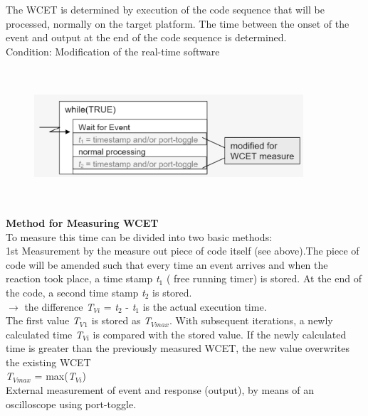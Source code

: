 The WCET is determined by execution of the code sequence that will be processed, normally on the target platform. The time between the onset of the event and output at the end of the code sequence is determined.\\
 
Condition: Modification of the real-time software

	\begin{figure}[h]
    \centering
    \includegraphics[width=10cm, height=5cm]{Images/image76.png}
    \label{fig:Fig }
    \end{figure}
\newpage

\textbf{Method for Measuring WCET}\\

To measure this time can be divided into two basic methods:\\


1st Measurement by the measure out piece of code itself (see above).The piece of code will be amended such that every time an event arrives and when the reaction took place, a time stamp\textit{ t}${}_{1}$ ( free running timer) is stored. At the end of the code, a second time stamp\textit{ t}${}_{2}$ is stored.\\
$\rightarrow$ the difference \textit{T${}_{Vi}$} = \textit{t}${}_{2}$ - \textit{t}${}_{1}$ is the actual execution time.\\
	
The first value \textit{T${}_{V}$}${}_{1}$ is stored as \textit{T${}_{Vmax}$}. With subsequent iterations, a newly calculated time \textit{T${}_{Vi}$}  is compared with the stored value. If the newly calculated time is greater than the previously measured WCET, the new value overwrites the existing WCET\\
	
\textit{T${}_{Vmax}$} = max(\textit{T${}_{Vi}$})\\

External measurement of event and response (output), by means of an oscilloscope using port-toggle.

